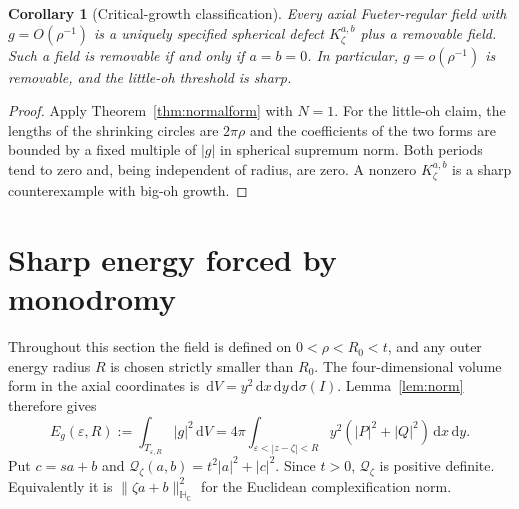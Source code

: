 \documentclass[11pt,a4paper]{article}
\numberwithin{equation}{section}
\newtheorem{corollary}[theorem]{Corollary}
\theoremstyle{definition}
\theoremstyle{remark}
\newcommand{\C}{\mathbb C}
\newcommand{\HC}{\mathbb H_{\C}}
\newcommand{\dd}{\,\mathrm d}
\newcommand{\qf}{\mathcal Q}
\begin{document}
\begin{corollary}[Critical-growth classification]
\label{cor:critical}
Every axial Fueter-regular field with $g=O(\rho^{-1})$ is a uniquely
specified spherical defect $K_\zeta^{a,b}$ plus a removable field.
Such a field is removable if and only if $a=b=0$. In particular,
$g=o(\rho^{-1})$ is removable, and the little-oh threshold is sharp.
\end{corollary}
\begin{proof}
Apply Theorem~\ref{thm:normalform} with $N=1$. For the little-oh claim,
the lengths of the shrinking circles are $2\pi\rho$ and the coefficients
of the two forms are bounded by a fixed multiple of $|g|$ in spherical
supremum norm. Both periods tend to zero and, being independent of
radius, are zero. A nonzero $K_\zeta^{a,b}$ is a sharp counterexample
with big-oh growth.
\end{proof}

\section{Sharp energy forced by monodromy}
\label{sec:energy}
Throughout this section the field is defined on $0<\rho<R_0<t$, and
any outer energy radius $R$ is chosen strictly smaller than $R_0$.
The four-dimensional volume form in the axial coordinates is
$\dd V=y^2\dd x\dd y\dd\sigma(I)$. Lemma~\ref{lem:norm} therefore gives
\begin{equation}
 E_g(\varepsilon,R):=\int_{T_{\varepsilon,R}}|g|^2\dd V
 =4\pi\int_{\varepsilon<|z-\zeta|<R}
        y^2(|P|^2+|Q|^2)\dd x\dd y.
 \label{eq:energy}
\end{equation}
Put $c=sa+b$ and $\qf_\zeta(a,b)=t^2|a|^2+|c|^2$.
Since $t>0$, $\qf_\zeta$ is positive definite. Equivalently it is
$\|\zeta a+b\|_{\HC}^2$ for the Euclidean complexification norm.
\end{document}

